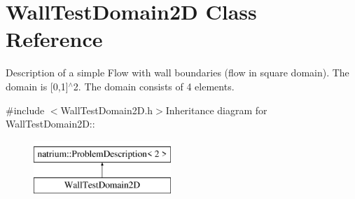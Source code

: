 \hypertarget{classWallTestDomain2D}{
\section{WallTestDomain2D Class Reference}
\label{classWallTestDomain2D}
}


Description of a simple Flow with wall boundaries (flow in square domain). The domain is \mbox{[}0,1\mbox{]}$^\wedge$2. The domain consists of 4 elements.  


{\ttfamily \#include $<$WallTestDomain2D.h$>$}Inheritance diagram for WallTestDomain2D::\begin{figure}[H]
\begin{center}
\leavevmode
\includegraphics[height=2cm]{classWallTestDomain2D}
\end{center}
\end{figure}
